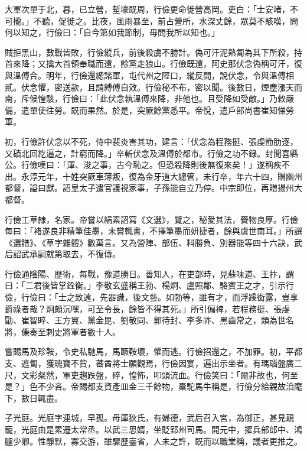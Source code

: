 \begin{pinyinscope}
 大軍次單于北，暮，已立營，塹壕既周，行儉更命徙營高岡。吏白：「士安堵，不可攏。」不聽，促徙之。比夜，風雨暴至，前占營所，水深丈餘，眾莫不駭嘆，問何以知之，行儉曰：「自今第如我節制，毋問我所以知也。」



 賊拒黑山，數戰皆敗，行儉縱兵，前後殺虜不勝計。偽可汗泥熟匐為其下所殺，持首來降；又擒大首領奉職而還，餘黨走狼山。行儉既還，阿史那伏念偽稱可汗，復與溫傅合。明年，行儉還總諸軍，屯代州之陘口，縱反間，說伏念，令與溫傅相貳。伏念懼，密送款，且請縛傅自效。行儉秘不布，密以聞。後數日，煙塵漲天而南，斥候惶駭，行儉曰：「此伏念執溫傅來降，非他也。且受降如受敵。」乃敕嚴備，遣單使往勞。既而果然。於是，突厥餘黨悉平。帝悅，遣戶部尚書崔知悌勞軍。



 初，行儉許伏念以不死，侍中裴炎害其功，建言：「伏念為程務挺、張虔勖肋逐，又磧北回紇逼之，計窮而降。」卒斬伏念及溫傅於都市。行儉之功不錄。封聞喜縣公。行儉嘆曰：「渾、浚之事，古今恥之。但恐殺降則後無復來矣！」遂稱疾不出。永淳元年，十姓突厥車薄叛，復為金牙道大總管，未行卒，年六十四，贈幽州都督，謚曰獻。詔皇太子遣官護視家事，子孫能自立乃停。中宗即位，再贈揚州大都督。



 行儉工草隸，名家。帝嘗以絹素詔寫《文選》，覽之，秘愛其法，賚物良厚。行儉每曰：「褚遂良非精筆佳墨，未嘗輒書，不擇筆墨而妍捷者，餘與虞世南耳。」所譔《選譜》、《草字雜體》數萬言。又為營陣、部伍、料勝負、別器能等四十六訣，武后詔武承嗣就第取去，不復傳。



 行儉通陰陽、歷術，每戰，豫道勝日。善知人，在吏部時，見蘇味道、王抃，謂曰：「二君後皆掌銓衡。」李敬玄盛稱王勃、楊炯、盧照鄰、駱賓王之才，引示行儉，行儉曰：「士之致遠，先器識，後文藝。如勃等，雖有才，而浮躁衒露，豈享爵祿者哉？炯頗沉嘿，可至令長，餘皆不得其死。」所引偏裨，若程務挺、張虔勖、崔智睟、王方翼、黨金毘、劉敬同、郭待封、李多祚、黑齒常之，類為世名將，傔奏至刺史將軍者數十人。



 嘗賜馬及珍鞍，令史私馳馬，馬蹶鞍壞，懼而逃。行儉招還之，不加罪。初，平都支、遮匐，獲瑰寶不貲，蕃酋將士願觀焉，行儉因宴，遍出示坐者。有瑪瑙盤廣二尺，文彩粲然，軍吏趨跌盤，碎，惶怖，叩頭流血。行儉笑曰：「爾非故也，何至是？」色不少吝。帝賜都支資產皿金三千餘物，橐駝馬牛稱是，行儉分給親故洎麾下，數日輒盡。



 子光庭。光庭字連城，早孤。母厙狄氏，有婦德，武后召入宮，為御正，甚見親寵，光庭由是累遷太常丞。以武三思婿，坐貶郢州司馬。開元中，擢兵部郎中、鴻臚少卿。性靜默，寡交游，雖驟歷臺省，人未之許，既而以職業稱，議者更推之。




\end{pinyinscope}
